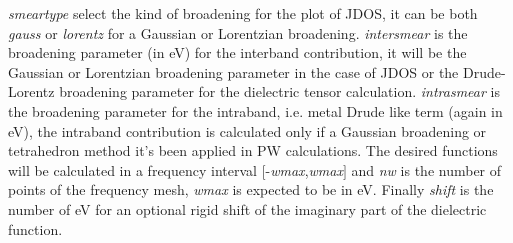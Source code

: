 \documentclass[twocolumn]{article}
\begin{document}
\emph{smeartype} select the kind of broadening for the plot of JDOS, it can be both
\emph{gauss} or \emph{lorentz} for a Gaussian or Lorentzian broadening. \emph{intersmear} is the broadening 
parameter (in eV) for the interband contribution,
it will be the Gaussian or Lorentzian broadening parameter in the case of JDOS
or the
Drude-Lorentz broadening parameter for the dielectric tensor calculation.
\emph{intrasmear} is the broadening parameter for the intraband, i.e. metal Drude like term (again in eV), 
the intraband contribution is calculated only if a Gaussian broadening or tetrahedron method it's been 
applied in PW calculations.    
The desired functions will be calculated in a frequency interval $\big[$-\emph{wmax},\emph{wmax}$\big]$ and \emph{nw}
is the number of points of the frequency mesh, \emph{wmax} is expected to be in eV. Finally \emph{shift} is the number
of eV for an optional rigid shift of the imaginary part of the dielectric function.
\end{document}
